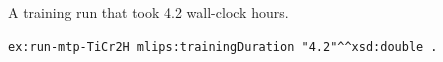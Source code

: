 A training run that took 4.2 wall-clock hours.
\begin{lstlisting}[language=turtle]
ex:run-mtp-TiCr2H mlips:trainingDuration "4.2"^^xsd:double .
\end{lstlisting}
